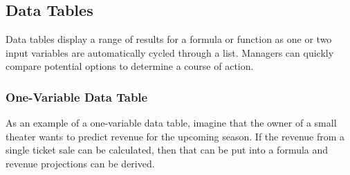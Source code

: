 \subsection{Data Tables}

Data tables display a range of results for a formula or function as one or two input variables are automatically cycled through a list. Managers can quickly compare potential options to determine a course of action.

\subsubsection{One-Variable Data Table}

As an example of a one-variable data table, imagine that the owner of a small theater wants to predict revenue for the upcoming season. If the revenue from a single ticket sale can be calculated, then that can be put into a formula and revenue projections can be derived.

